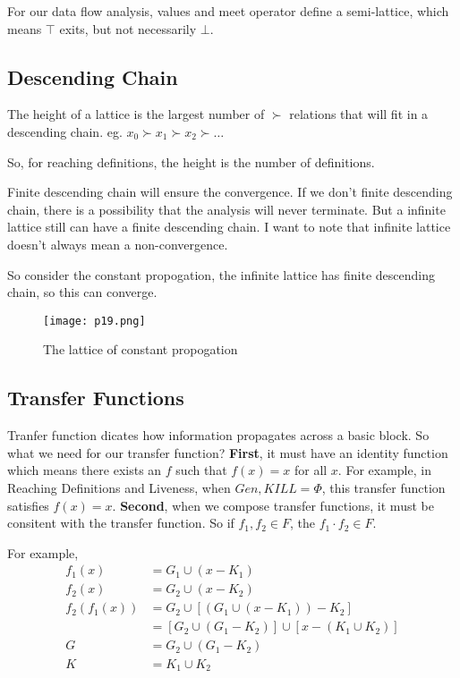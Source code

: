 

For our data flow analysis, values and meet operator define a semi-lattice, which means \(\top\) exits, but not necessarily \(	\bot\).





\subsection{Descending Chain}

The height of a lattice is the largest number of \(\succ \) relations that will fit in a descending chain. eg. \(x_0 \succ x_1 \succ x_2 \succ \dots\)

So, for reaching definitions, the height is the number of definitions.

Finite descending chain will ensure the convergence. If we don't finite descending chain, there is a possibility that
the analysis will never terminate. But a infinite lattice still can have a finite descending chain. I want to note that
infinite lattice doesn't always mean a non-convergence.

So consider the constant propogation, the infinite lattice has finite descending chain, so this can converge.

\begin{figure}[h]
	\centering
	\texttt{[image: p19.png]}
	\caption{The lattice of constant propogation}
	\label{fig:p19}
\end{figure}


\subsection{Transfer Functions}

Tranfer function dicates how information propagates across a basic block.
So what we need for our transfer function? \textbf{First}, it must have an identity function which means
there exists an \(f\) such that \(f(x) = x \) for all \(x\). For example, in Reaching Definitions and Liveness, when
\(Gen, KILL = \Phi \), this transfer function satisfies \(f(x) = x \). \textbf{Second}, when we compose transfer functions,
it must be consitent with the transfer function. So if \(f_1,f_2 \in F\), the  \(f_1	\cdot f_2 \in F\).


For example,
\begin{align*}
	f_1(x)      & = G_1 \cup (x - K_1)                             \\
	f_2(x)      & = G_2 \cup (x - K_2)                             \\
	f_2(f_1(x)) & = G_2 \cup [(G_1 \cup (x - K_1)) - K_2]          \\
	            & = [G_2 \cup (G_1 - K_2)] \cup [x-(K_1 \cup K_2)] \\
	G           & = G_2 \cup (G_1 - K_2)                           \\
	K           & = K_1 \cup K_2
\end{align*}


